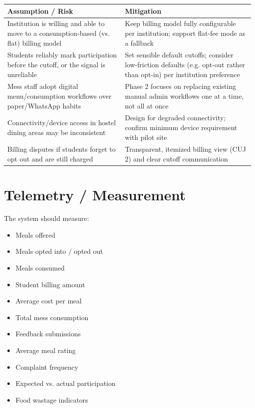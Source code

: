 \documentclass[12pt,a4paper]{article}
\begin{document}
\begin{center}
\small
\begin{tabularx}{0.99\textwidth}{L{0.36\textwidth} Y}
\toprule
\textbf{Assumption / Risk} & \textbf{Mitigation}\\
\midrule
Institution is willing and able to move to a consumption-based (vs. flat)
billing model &
Keep billing model fully configurable per institution; support flat-fee mode
as a fallback\\
Students reliably mark participation before the cutoff, or the signal is
unreliable &
Set sensible default cutoffs; consider low-friction defaults (e.g. opt-out
rather than opt-in) per institution preference\\
Mess staff adopt digital menu/consumption workflows over paper/WhatsApp habits &
Phase 2 focuses on replacing existing manual admin workflows one at a time,
not all at once\\
Connectivity/device access in hostel dining areas may be inconsistent &
Design for degraded connectivity; confirm minimum device requirement with
pilot site\\
Billing disputes if students forget to opt out and are still charged &
Transparent, itemized billing view (CUJ 2) and clear cutoff communication\\
\bottomrule
\end{tabularx}
\end{center}


\section{Telemetry / Measurement}

The system should measure:

\begin{itemize}
    \item Meals offered
    \item Meals opted into / opted out
    \item Meals consumed
    \item Student billing amount
    \item Average cost per meal
    \item Total mess consumption
    \item Feedback submissions
    \item Average meal rating
    \item Complaint frequency
    \item Expected vs. actual participation
    \item Food wastage indicators
\end{itemize}
\end{document}
